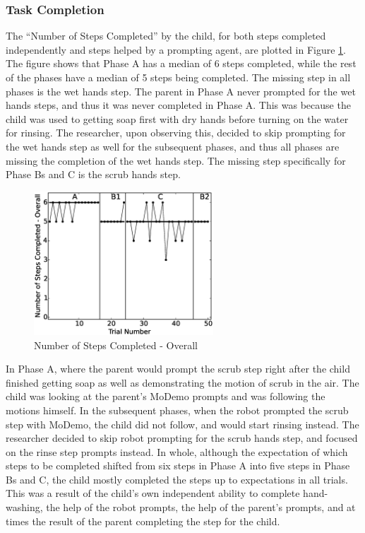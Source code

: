 \documentclass{ut-thesis}
\begin{document}
\subsubsection{Task Completion}
The ``Number of Steps Completed'' by the child, for both steps completed independently and steps helped by a prompting agent, are plotted in Figure \ref{fig:0NumberofStepsCompleted-Overall}.  The figure shows that Phase A has a median of 6 steps completed, while the rest of the phases have a median of 5 steps being completed.  The missing step in all phases is the wet hands step.  The parent in Phase A never prompted for the wet hands steps, and thus it was never completed in Phase A.  This was because the child was used to getting soap first with dry hands before turning on the water for rinsing.  The researcher, upon observing this, decided to skip prompting for the wet hands step as well for the subsequent phases, and thus all phases are missing the completion of the wet hands step.  The missing step specifically for Phase Bs and C is the scrub hands step.
\begin{figure} [h]
	\centering
	\includegraphics[width=0.6\textwidth]{./img/data_analysis/0NumberofStepsCompleted-Overall.eps}
	\caption{Number of Steps Completed - Overall}
	\label{fig:0NumberofStepsCompleted-Overall}
\end{figure}

In Phase A, where the parent would prompt the scrub step right after the child finished getting soap as well as demonstrating the motion of scrub in the air.  The child was looking at the parent's MoDemo prompts and was following the motions himself.  In the subsequent phases, when the robot prompted the scrub step with MoDemo, the child did not follow, and would start rinsing instead.  The researcher decided to skip robot prompting for the scrub hands step, and focused on the rinse step prompts instead.  In whole, although the expectation of which steps to be completed shifted from six steps in Phase A into five steps in Phase Bs and C, the child mostly completed the steps up to expectations in all trials.  This was a result of the child's own independent ability to complete hand-washing, the help of the robot prompts, the help of the parent's prompts, and at times the result of the parent completing the step for the child.
\end{document}
